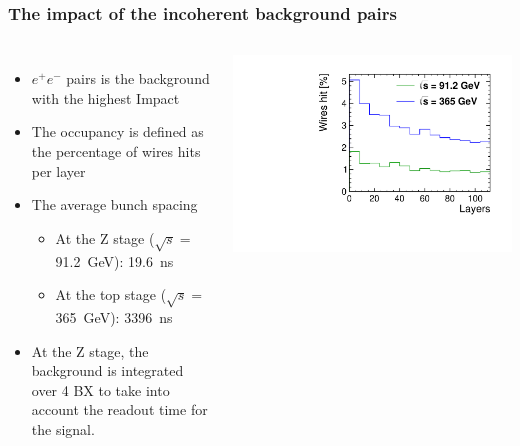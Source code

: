 \documentclass[aspectratio=169, hyperref={colorlinks=true,pdfpagelabels=false,linkcolor=black}, xcolor=dvipsnames,10pt]{beamer}
\begin{document}
\begin{frame}
  \frametitle{The impact of the incoherent background pairs}

  \begin{columns}

    \begin{itemize}
      \item $e^+e^-$ pairs is the background with the highest Impact
      \item The occupancy is defined as the percentage of wires hits per layer
      \item The average bunch spacing
        \begin{itemize}
          \item At the Z stage ($\sqrt{s}=$91.2~GeV): 19.6~ns
          \item At the top stage ($\sqrt{s}=$365~GeV): 3396~ns
        \end{itemize}
      \item At the Z stage, the background is integrated over 4 BX to take into account the readout time for the signal.
    \end{itemize}

    \centering
    \includegraphics[width=\textwidth]{Figures/incoherent_top_Z.pdf}

  \end{columns}

\end{frame}
\end{document}
